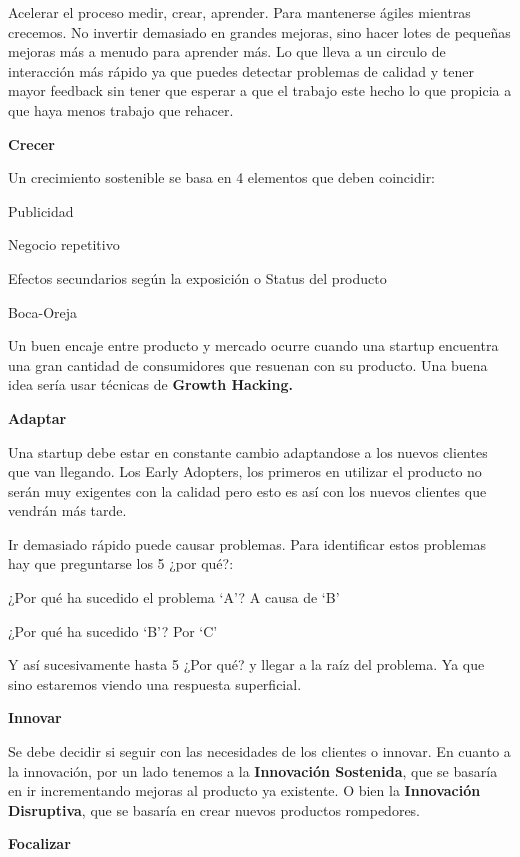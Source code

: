 \documentclass[12pt,twoside,titlepage]{report}
\begin{document}
Acelerar el proceso medir, crear, aprender. Para mantenerse ágiles mientras crecemos. No invertir demasiado en grandes mejoras, sino hacer lotes de pequeñas mejoras más a menudo para aprender más. Lo que lleva a un circulo de interacción más rápido ya que puedes detectar problemas de calidad y tener mayor feedback sin tener que esperar a que el trabajo este hecho lo que propicia a que haya menos trabajo que rehacer.

\textbf{Crecer}

Un crecimiento sostenible se basa en 4 elementos que deben coincidir: 
\begin{compactitem}
    \item Publicidad
    \item Negocio repetitivo
    \item Efectos secundarios según la exposición o Status del producto
    \item Boca-Oreja
\end{compactitem}


Un buen encaje entre producto y mercado ocurre cuando una startup encuentra una gran cantidad de consumidores que resuenan con su producto. Una buena idea sería usar técnicas de \textbf{Growth Hacking.}

\textbf{Adaptar}

Una startup debe estar en constante cambio adaptandose a los nuevos clientes que van llegando. Los Early Adopters, los primeros en utilizar el producto no serán muy exigentes con la calidad pero esto es así con los nuevos clientes que vendrán más tarde.

Ir demasiado rápido puede causar problemas. Para identificar estos problemas hay que preguntarse los 5 ¿por qué?:

¿Por qué ha sucedido el problema ‘A’? A causa de ‘B’

¿Por qué ha sucedido ‘B’? Por ‘C’

Y así sucesivamente hasta 5 ¿Por qué? y llegar a la raíz del problema. Ya que sino estaremos viendo una respuesta superficial.

\textbf{Innovar}

Se debe decidir si seguir con las necesidades de los clientes o innovar. En cuanto a la innovación, por un lado tenemos a la \textbf{Innovación Sostenida}, que se basaría en ir incrementando mejoras al producto ya existente. O bien la \textbf{Innovación Disruptiva}, que se basaría en crear nuevos productos rompedores.

\textbf{Focalizar}
\end{document}
